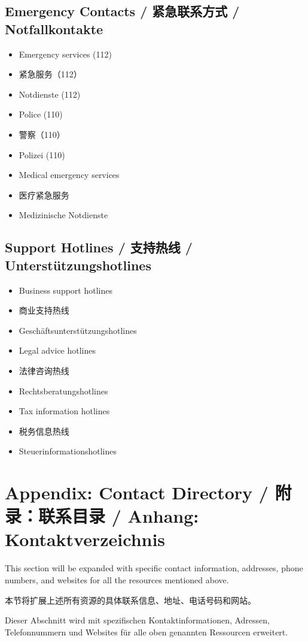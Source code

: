 \subsection{Emergency Contacts / 紧急联系方式 / Notfallkontakte}
\begin{itemize}
    \item Emergency services (112)
    \item 紧急服务（112）
    \item Notdienste (112)
    \item Police (110)
    \item 警察（110）
    \item Polizei (110)
    \item Medical emergency services
    \item 医疗紧急服务
    \item Medizinische Notdienste
\end{itemize}

\subsection{Support Hotlines / 支持热线 / Unterstützungshotlines}
\begin{itemize}
    \item Business support hotlines
    \item 商业支持热线
    \item Geschäftsunterstützungshotlines
    \item Legal advice hotlines
    \item 法律咨询热线
    \item Rechtsberatungshotlines
    \item Tax information hotlines
    \item 税务信息热线
    \item Steuerinformationshotlines
\end{itemize}

\section{Appendix: Contact Directory / 附录：联系目录 / Anhang: Kontaktverzeichnis}

This section will be expanded with specific contact information, addresses, phone numbers, and websites for all the resources mentioned above.

本节将扩展上述所有资源的具体联系信息、地址、电话号码和网站。

Dieser Abschnitt wird mit spezifischen Kontaktinformationen, Adressen, Telefonnummern und Websites für alle oben genannten Ressourcen erweitert.
